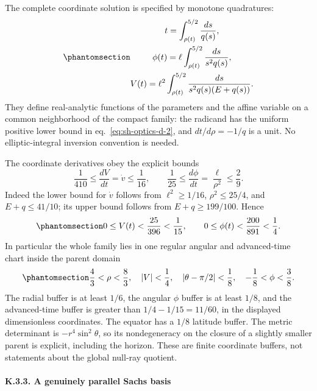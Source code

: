 \documentclass[
  english,
  11pt,
  reqno]{amsart}
\begin{document}
The complete coordinate solution is specified by monotone quadratures:
\begin{equation}\protect\phantomsection\label{eq:sh-optics-d-4}{\begin{gathered}
t=\int_{\rho(t)}^{5/2}\frac{ds}{q(s)}, \\
\phi(t)=\ell\int_{\rho(t)}^{5/2}\frac{ds}{s^2q(s)}, \\
V(t)=\ell^2\int_{\rho(t)}^{5/2}\frac{ds}{s^2q(s)(E+q(s))}.
\end{gathered}}\end{equation} They define real-analytic functions of the parameters
and the affine variable on a common neighborhood of the compact family:
the radicand has the uniform positive lower bound in
eq.~\ref{eq:sh-optics-d-2}, and \(dt/d\rho=-1/q\) is a unit. No
elliptic-integral inversion convention is needed.

The coordinate derivatives obey the explicit bounds \[
 \frac1{410}\le\frac{dV}{dt}=\dot v\le\frac1{16},\qquad
 \frac1{25}\le\frac{d\phi}{dt}=\frac\ell{\rho^2}\le\frac29.
\] Indeed the lower bound for \(\dot v\) follows from \(\ell^2\ge1/16\),
\(\rho^2\le25/4\), and \(E+q\le41/10\); its upper bound follows from
\(E+q\ge199/100\). Hence
\begin{equation}\protect\phantomsection\label{eq:sh-optics-d-5}{
 0\le V(t)<\frac{25}{396}<\frac1{15},\qquad
 0\le\phi(t)<\frac{200}{891}<\frac14.
}\end{equation} In particular the whole family lies in one regular
angular and advanced-time chart inside the parent domain
\begin{equation}\protect\phantomsection\label{eq:sh-optics-d-6}{
 \frac43<\rho<\frac83,\quad |V|<\frac14,\quad
 |\theta-\pi/2|<\frac18,\quad -\frac18<\phi<\frac38.
}\end{equation} The radial buffer is at least \(1/6\), the angular
\(\phi\) buffer is at least \(1/8\), and the advanced-time buffer is
greater than \(1/4-1/15=11/60\), in the displayed dimensionless
coordinates. The equator has a \(1/8\) latitude buffer. The metric
determinant is \(-r^4\sin^2\theta\), so its nondegeneracy on the closure
of a slightly smaller parent is explicit, including the horizon. These
are finite coordinate buffers, not statements about the global null-ray
quotient.

\protect{}\label{sec:sh-optics-3}

\paragraph{K.3.3. A genuinely parallel Sachs
basis}\label{k.3.3.-a-genuinely-parallel-sachs-basis}
\end{document}
